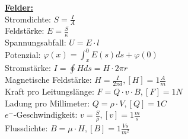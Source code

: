 \documentclass[11pt]{article}
\begin{document}
\begin{minipage}{0.45\textwidth}
\underline{\textbf{Felder: }}\\
Stromdichte: $S=\frac{I}{A}$\\
Feldstärke: $E=\frac{S}{\kappa}$\\
Spannungsabfall: $U=E \cdot l$\\
    Potenzial: $\varphi (x)= \int_x^0 E(s)ds + \varphi(0)$\\
Stromstärke: $I = \oint H ds = H \cdot 2\pi r$\\
Magnetische Feldstärke: $H = \frac{I}{2\pi d}, [H] = 1\frac{A}{m}$\\
Kraft pro Leitungslänge: $F=Q \cdot v \cdot B, [F] = 1N$\\
Ladung pro Millimeter: $Q = \rho \cdot V, [Q] = 1C$\\
$e^-$-Geschwindigkeit: $v = \frac{S}{\rho}, [v] = 1\frac{m}{s}$\\
Flussdichte: $B=\mu \cdot H, [B] = 1 \frac{Vs}{m^2}$\\

\end{minipage}%
~~~~~~~
\end{document}
